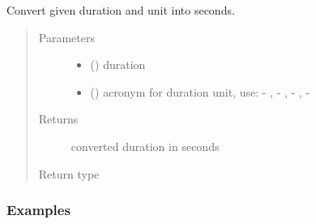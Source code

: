 \documentclass[a4paper,12pt,english]{sphinxmanual}
\begin{document}
\begin{fulllineitems}
\label{\detokenize{project_rst/user_rst/helpers:project.user.helpers.convert_into_seconds}}
Convert given duration and unit into seconds.
\begin{quote}\begin{description}
\item[{Parameters}] \leavevmode\begin{itemize}
\item {} 
 () \textendash{} duration

\item {} 
 () \textendash{} acronym for duration unit,
use:  - ,  - ,  - ,  - 

\end{itemize}

\item[{Returns}] \leavevmode
converted duration in seconds

\item[{Return type}] \leavevmode
{}

\end{description}\end{quote}
\subsubsection*{Examples}


\end{fulllineitems}
\end{document}
